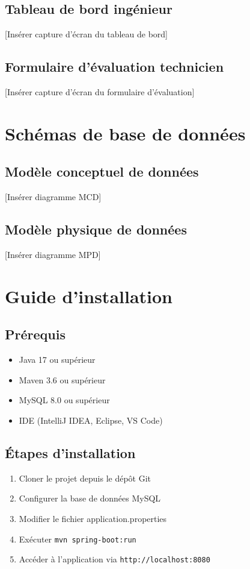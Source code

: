 \subsection{Tableau de bord ingénieur}
[Insérer capture d'écran du tableau de bord]

\subsection{Formulaire d'évaluation technicien}
[Insérer capture d'écran du formulaire d'évaluation]

\section{Schémas de base de données}

\subsection{Modèle conceptuel de données}
[Insérer diagramme MCD]

\subsection{Modèle physique de données}
[Insérer diagramme MPD]

\section{Guide d'installation}

\subsection{Prérequis}
\begin{itemize}
    \item Java 17 ou supérieur
    \item Maven 3.6 ou supérieur
    \item MySQL 8.0 ou supérieur
    \item IDE (IntelliJ IDEA, Eclipse, VS Code)
\end{itemize}

\subsection{Étapes d'installation}
\begin{enumerate}
    \item Cloner le projet depuis le dépôt Git
    \item Configurer la base de données MySQL
    \item Modifier le fichier application.properties
    \item Exécuter \texttt{mvn spring-boot:run}
    \item Accéder à l'application via \texttt{http://localhost:8080}
\end{enumerate}

